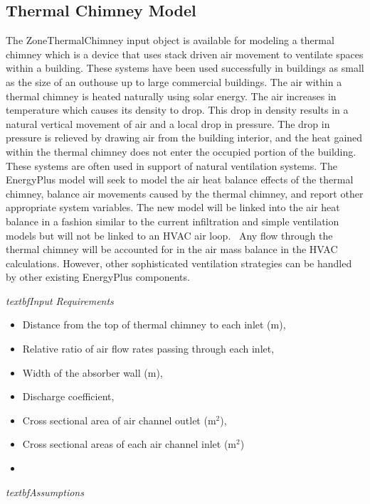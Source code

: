 \subsection{Thermal Chimney Model}\label{thermal-chimney-model}

The ZoneThermalChimney input object is available for modeling a thermal chimney which is a device that uses stack driven air movement to ventilate spaces within a building. These systems have been used successfully in buildings as small as the size of an outhouse up to large commercial buildings. The air within a thermal chimney is heated naturally using solar energy. The air increases in temperature which causes its density to drop. This drop in density results in a natural vertical movement of air and a local drop in pressure. The drop in pressure is relieved by drawing air from the building interior, and the heat gained within the thermal chimney does not enter the occupied portion of the building. These systems are often used in support of natural ventilation systems. The EnergyPlus model will seek to model the air heat balance effects of the thermal chimney, balance air movements caused by the thermal chimney, and report other appropriate system variables. The new model will be linked into the air heat balance in a fashion similar to the current infiltration and simple ventilation models but will not be linked to an HVAC air loop.~ Any flow through the thermal chimney will be accounted for in the air mass balance in the HVAC calculations. However, other sophisticated ventilation strategies can be handled by other existing EnergyPlus components.

\emph{textbf{Input Requirements}}

\begin{itemize}
\item
  Distance from the top of thermal chimney to each inlet (m),
\item
  Relative ratio of air flow rates passing through each inlet,
\item
  Width of the absorber wall (m),
\item
  Discharge coefficient,
\item
  Cross sectional area of air channel outlet (m\(^{2}\)),
\item
  Cross sectional areas of each air channel inlet (m\(^{2}\))
\item
\end{itemize}

\emph{textbf{Assumptions}}

